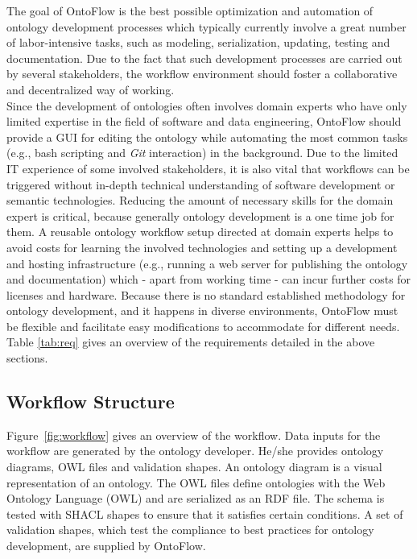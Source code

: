 \documentclass[runningheads]{llncs}
\begin{document}
The goal of OntoFlow is the best possible optimization and automation of ontology development processes which typically currently involve a great number of labor-intensive tasks, such as modeling, serialization, updating, testing and documentation. Due to the fact that such development processes are carried out by several stakeholders, the workflow environment should foster a collaborative and decentralized way of working.\\
Since the development of ontologies often involves domain experts who have only limited expertise in the field of software and data engineering, OntoFlow should provide a GUI for editing the ontology while automating the most common tasks (e.g., bash scripting and \textit{Git} interaction) in the background. Due to the limited IT experience of some involved stakeholders, it is also vital that workflows can be triggered without in-depth technical understanding of software development or semantic technologies. Reducing the amount of necessary skills for the domain expert is critical, because generally ontology development is a one time job for them. A reusable ontology workflow setup directed at domain experts helps to avoid costs for learning the involved technologies and setting up a development and hosting infrastructure (e.g., running a web server for publishing the ontology and documentation) which - apart from working time - can incur further costs for licenses and hardware. Because there is no standard established methodology for ontology development, and it happens in diverse environments, OntoFlow must be flexible and facilitate easy modifications to accommodate for different needs. Table \ref{tab:req} gives an overview of the requirements detailed in the above sections.

\subsection{Workflow Structure}
Figure~\ref{fig:workflow} gives an overview of the workflow. Data inputs for the workflow are generated by the ontology developer. He/she provides ontology diagrams, OWL files and validation shapes. An ontology diagram is a visual representation of an ontology. The OWL files define ontologies with the Web Ontology Language (OWL) and are serialized as an RDF file. The schema is tested with SHACL shapes to ensure that it satisfies certain conditions. A set of validation shapes, which test the compliance to best practices for ontology development, are supplied by OntoFlow.
\end{document}
